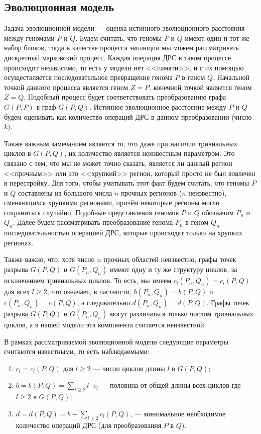 \subsection{Эволюционная модель}
Задача эволюционной модели --- оценка истинного эволюционного расстояния между геномами $P$ и $Q$.
Будем считать, что геномы $P$ и $Q$ имеют один и тот же набор блоков, тогда в качестве процесса эволюции мы можем рассматривать дискретный марковский процесс.
Каждая операция ДРС в таком процессе происходит независимо, то есть у модели нет <<памяти>>, и с их помощью осуществляется последовательное превращение генома $P$ в геном $Q$.
Начальной точкой данного процесса является геном $Z = P$, конечной точкой является геном $Z = Q$.
Подобный процесс будет соответствовать преобразованию графа $G (P, P)$  в граф $G (P, Q)$.
Истинное эволюционное расстояние между $P$ и $Q$ будем оценивать как количество операций ДРС в данном преобразовании (число $k$).

Также важным замечанием является то, что даже при наличии тривиальных циклов в $G (P, Q)$, их количество является неизвестным параметром.
Это связано с тем, что мы не может точно сказать, является ли данный регион <<прочным>> или это <<хрупкий>> регион, который просто не был вовлечен в перестройку.
Для того, чтобы учитывать этот факт будем считать, что геномы $P$ и $Q$  составлены из большого числа $n$ прочных регионов ($n$ неизвестно), сменяющихся хрупкими регионами, причём некоторые регионы могли сохраниться случайно.
Подобные представления геномов $P$ и $Q$ обозначим $P_n$ и $Q_n$.
Далее будем рассматривать преобразование генома $P_n$ в геном $Q_n$ последовательностью операцией ДРС, которые происходят только на хрупких регионах.

Также важно, что, хотя число $n$ прочных областей неизвестно, графы точек разрыва $G (P, Q)$ и $G (P_n, Q_n)$ имеют одну и ту же структуру циклов, за исключением тривиальных циклов.
То есть, мы имеем $c_l (P_n, Q_n) = c_l (P, Q)$ для всех $l \geq 2$, что означает, в частности, $b (P_n, Q_n) = b (P, Q)$ и $c (P_n, Q_n) = c (P, Q)$, а следовательно $d (P_n, Q_n) = d (P, Q)$.
Графы точек разрыва $G (P, Q)$ и $G (P_n, Q_n)$ могут различаться только числом тривиальных циклов, а в нашей модели эта компонента считается неизвестной.

В рамках рассматриваемой эволюционной модели следующие параметры считаются известными, то есть наблюдаемыми:
\begin{enumerate}
    \item $c_l = c_l (P, Q)$ для $l \geq 2$ --- число циклов длины $l$ в $G (P, Q)$;
    \item $b = b (P, Q) = \sum_{l \geq 2} l \cdot c_l$ --- половина от общей длины всех циклов где $l \geq 2$ в $G (P, Q)$;
    \item $d = d (P, Q) = b - \sum_{l \geq 2} c_l(P, Q)$, --- минимальное необходимое количество операций ДРС (для преобразования $P$ в $Q$).
\end{enumerate}

